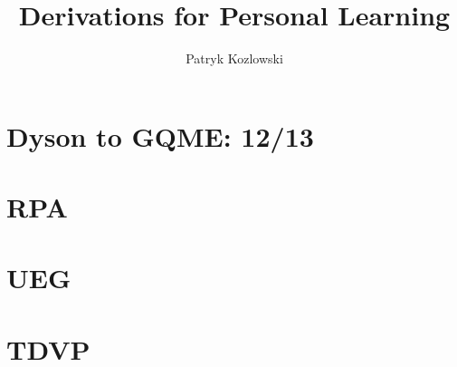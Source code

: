 \documentclass[12pt]{report}
\title{Derivations for Personal Learning}
\author{Patryk Kozlowski}
\begin{document}
\setcounter{tocdepth}{3}  %
\tableofcontents
\clearpage  %

\maketitle

% 
\chapter{Dyson to GQME: 12/13}

\chapter{RPA}

% 
% 
% 
\chapter{UEG}

\chapter{TDVP}

% 
% 
% 
% 
% 




% 


\end{document}
